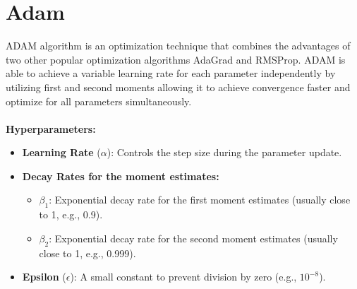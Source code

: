 \documentclass{article}
\begin{document}
\section*{Adam}
ADAM algorithm is an optimization technique that combines the advantages of two other popular optimization algorithms AdaGrad and RMSProp. ADAM is able to achieve a variable learning rate for each parameter independently by utilizing first and second moments allowing it to achieve convergence faster and optimize for all parameters simultaneously.  \\
\\

\textbf{Hyperparameters:}
\begin{itemize}
    \item \textbf{Learning Rate} ($\alpha$): Controls the step size during the parameter update.
    \item \textbf{Decay Rates for the moment estimates:}
    \begin{itemize}
        \item $\beta_1$: Exponential decay rate for the first moment estimates (usually close to 1, e.g., 0.9).
        \item $\beta_2$: Exponential decay rate for the second moment estimates (usually close to 1, e.g., 0.999).
    \end{itemize}
    \item \textbf{Epsilon} ($\epsilon$): A small constant to prevent division by zero (e.g., $10^{-8}$).
\end{itemize}

\newpage
\end{document}
